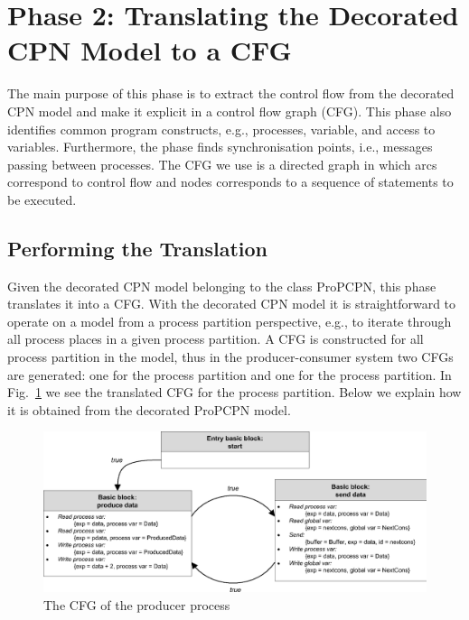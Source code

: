 \section{Phase 2: Translating the Decorated CPN Model to a CFG}
\label{sec:dcpntocfg}
The main purpose of this phase is to extract the control flow from the decorated CPN model and make it explicit in a control flow graph (CFG). This phase also identifies common program constructs, e.g., processes, variable, and access to variables. Furthermore, the phase finds synchronisation points, i.e., messages passing between processes. The CFG we use is a directed graph in which arcs correspond to control flow and nodes corresponds to a sequence of statements to be executed.

\subsection{Performing the Translation}
\label{sec:cpntranslation}
Given the decorated CPN model belonging to the class ProPCPN, this phase translates it into a CFG. With the decorated CPN model it is straightforward to operate on a model from a process partition perspective, e.g., to iterate through all process places in a given process partition. A CFG is constructed for all process partition in the model, thus in the producer-consumer system two CFGs are generated: one for the  process partition and one for the  process partition. In Fig.~\ref{fig:prodconscfg} we see the translated CFG for the  process partition. Below we explain how it is obtained from the decorated ProPCPN model.

\begin{figure}[b!]
\centering
\includegraphics[width=\textwidth]{translation/dcpn_to_cfg/graphics/producerconsumercfg.eps}
\caption{The CFG of the producer process}
\label{fig:prodconscfg}
\end{figure}


